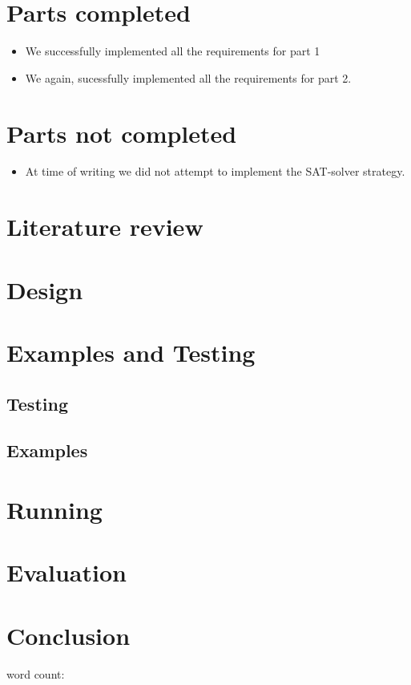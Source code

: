 \documentclass[british]{article}
\title{}
\author{170008773}
\date{\today}
\begin{document}
\maketitle


\section{Parts completed}
\label{completed}
\begin{itemize}
\item We successfully implemented all the requirements for part 1
\item We again, sucessfully implemented all the requirements for part 2.
\end{itemize}

\section{Parts not completed}
\label{uncompleted}
\begin{itemize}
\item At time of writing we did not attempt to implement the SAT-solver strategy.
\end{itemize}

\section{Literature review}
\label{litrev}
\cite{Russell2014}
 
\section{Design}
\label{design}

\section{Examples and Testing}
\label{sec:testing}
 
\subsection{Testing}
\label{subsec:testing}


\subsection{Examples}
\label{example}

 
\section{Running}
\label{running}

 
\section{Evaluation}
\label{evals}


\section{Conclusion}
\label{conclusion}

 
 
word count:
{}

\end{document}
